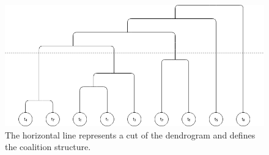   \begin{figure} [hbt]
    \centering
    \includegraphics[width=\textwidth]{img/SP.png}
    \caption{The horizontal line represents a cut of the dendrogram
    and defines the coalition structure.}
    \label{fig:SP_graph}
\end{figure}
